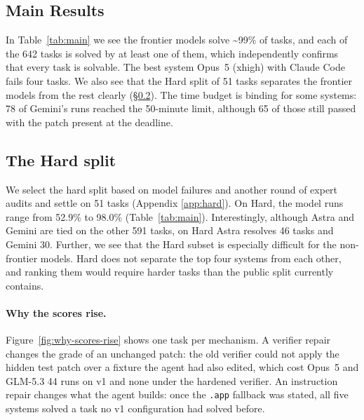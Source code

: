 \subsection{Main Results}
\label{sec:main-results}
In Table~\ref{tab:main} we see the frontier models solve \textasciitilde 99\% of tasks, and each of the 642 tasks is solved by at least one of them, which independently confirms that every task is solvable. The best system Opus~5 (xhigh) with Claude Code fails four tasks. We also see that the Hard split of 51 tasks separates the frontier models from the rest clearly (\S\ref{sec:hard}). The time budget is binding for some systems: 78 of Gemini's runs reached the 50-minute limit, although 65 of those still passed with the patch present at the deadline.


\subsection{The Hard split}
\label{sec:hard}
We select the hard split based on model failures and another round of expert audits and settle on 51 tasks (Appendix \ref{app:hard}). On Hard, the model runs range from 52.9\% to 98.0\% (Table~\ref{tab:main}). Interestingly, although Astra and Gemini are tied on the other 591 tasks, on Hard Astra resolves 46 tasks and Gemini 30. Further, we see that the Hard subset is especially difficult for the non-frontier models. Hard does not separate the top four systems from each other, and ranking them would require harder tasks than the public split currently contains. 


\paragraph{Why the scores rise.} Figure~\ref{fig:why-scores-rise} shows one task per mechanism. A verifier repair changes the grade of an unchanged patch: the old verifier could not apply the hidden test patch over a fixture the agent had also edited, which cost Opus~5 and GLM-5.3 44 runs on v1 and none under the hardened verifier. An instruction repair changes what the agent builds: once the \texttt{.app} fallback was stated, all five systems solved a task no v1 configuration had solved before.


